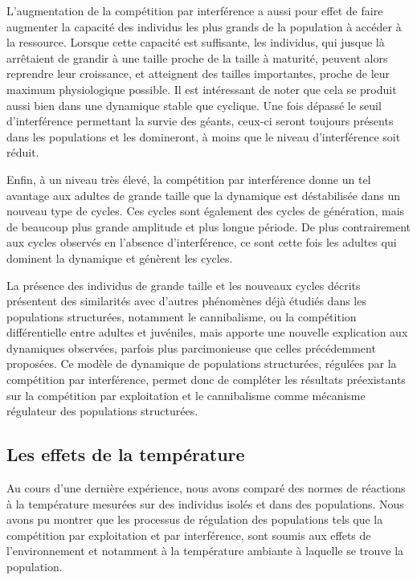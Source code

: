 L'augmentation de la compétition par interférence a aussi pour effet de faire
augmenter la capacité des individus les plus grands de la population à accéder à
la ressource. Lorsque cette capacité est suffisante, les individus, qui jusque
là arrêtaient de grandir à une taille proche de la taille à maturité, peuvent
alors reprendre leur croissance, et atteignent des tailles importantes, proche
de leur maximum physiologique possible. Il est intéressant de noter que cela se
produit aussi bien dans une dynamique stable que cyclique. Une fois dépassé le
seuil d'interférence permettant la survie des géants, ceux-ci seront toujours
présents dans les populations et les domineront, à moins que le niveau
d'interférence soit réduit. 

Enfin, à un niveau très élevé, la compétition par interférence donne un tel
avantage aux adultes de grande taille que la dynamique est déstabilisée dans un
nouveau type de cycles. Ces cycles sont également des
cycles de génération, mais de beaucoup plus grande amplitude et plus longue
période. De plus contrairement aux cycles observés en l'absence d'interférence,
ce sont cette fois les adultes qui dominent la dynamique et génèrent les cycles. 

La présence des individus de grande taille et les nouveaux cycles décrits
présentent des similarités avec d'autres phénomènes déjà étudiés dans les
populations structurées, notamment le cannibalisme, ou la compétition
différentielle entre adultes et juvéniles, mais apporte une nouvelle explication
aux dynamiques observées, parfois plus parcimonieuse que celles précédemment
proposées. Ce modèle de dynamique de populations structurées, régulées par la
compétition par interférence, permet donc de compléter les résultats
préexistants sur la compétition par exploitation et le cannibalisme comme
mécanisme régulateur des populations structurées. 

\subsection{Les effets de la température}

Au cours d'une dernière expérience, nous avons comparé des normes de réactions à
la température mesurées sur des individus isolés et dans des populations. Nous
avons pu montrer que les processus de régulation des populations tels que la
compétition par exploitation et par interférence, sont soumis aux
effets de l'environnement et notamment à la température ambiante à laquelle se
trouve la population. 

